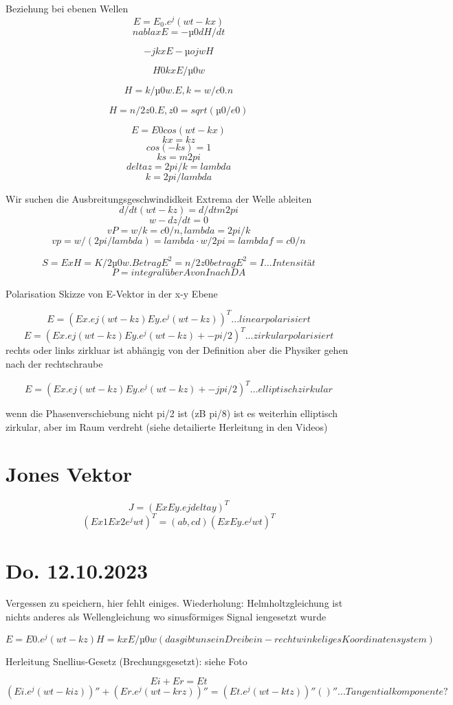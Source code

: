 \documentclass[a4paper]{article}
\begin{document}
Beziehung bei ebenen Wellen
\[ E=E_0.e^j(wt-kx) \]
\[ nablaxE=-µ0dH/dt \]

\[ -jkxE-µojwH \]

\[ H0kxE/µ0w \]


\[H=k/µ0w.E, k=w/c0.n\]

\[H=n/2z0.E, z0=sqrt(µ0/e0)\]

\[E=E0cos(wt-kx)\]
\[kx=kz\]
\[cos(-ks)=1\]
\[ks=m2pi\]
\[deltaz=2pi/k=lambda\]
\[k=2pi/lambda\]

Wir suchen die Ausbreitungsgeschwindidkeit
Extrema der Welle ableiten
\[d/dt(wt-kz)=d/dtm2pi\]
\[w-dz/dt=0\]
\[vP=w/k=c0/n, lambda =2pi/k\]
\[vp =w/(2pi/lambda)=lambda\cdot w/2pi=lambdaf=c0/n\]

\[S=ExH=K/2µ0w.BetragE ^2=n/2z0betragE^2=I ... Intensität\]
\[P=integral über A von I nach DA\]

Polarisation
Skizze von E-Vektor in der  x-y Ebene

\[E=(Ex.ej(wt-kz) Ey.e^j(wt-kz))^T ...linear polarisiert\]
\[E=(Ex.ej(wt-kz) Ey.e^j(wt-kz)+-pi/2)^T ...zirkular polarisiert\]
rechts oder links zirkluar ist abhängig von der Definition aber die Physiker gehen nach der rechtschraube

\[E=(Ex.ej(wt-kz) Ey.e^j(wt-kz)+-jpi/2)^T   ...elliptisch zirkular\]

wenn die Phasenverschiebung nicht pi/2 ist (zB pi/8) ist es weiterhin elliptisch zirkular, aber im Raum verdreht (siehe detailierte Herleitung in den Videos)

\section*{Jones Vektor} 
\[J = ( Ex Ey.ejdeltay)^T\]
\[(Ex1 Ex2 e^jwt)^T=(a b ,c d)(Ex Ey.e^jwt)^T\]

\section*{Do. 12.10.2023}
 Vergessen zu speichern, hier fehlt einiges.
Wiederholung: Helmholtzgleichung ist nichts anderes als Wellengleichung wo sinusförmiges Signal iengesetzt wurde

\[E=E0.e^j(wt-kz) H=kxE/µ0w (das gibt uns ein Dreibein - rechtwinkeliges Koordinatensystem)\]

Herleitung Snellius-Gesetz (Brechungsgesetzt): siehe Foto

\[Ei + Er = Et\]
\[(Ei.e^j(wt-kiz))'' + (Er.e^j(wt-krz))'' = (Et.e^j(wt-ktz))''           ()'' ... Tangentialkomponente ?\]
\end{document}
